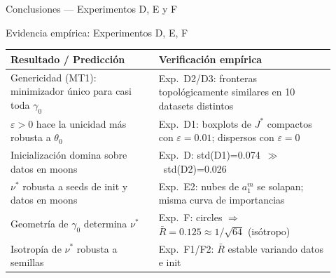 \documentclass[10pt]{beamer}
\begin{document}
\begin{frame}{Conclusiones — Experimentos D, E y F}

\begin{block}{Evidencia empírica: Experimentos D, E, F}
\small
\begin{tabular}{p{0.42\linewidth}p{0.50\linewidth}}
  \toprule
  Resultado / Predicción & Verificación empírica \\
  \midrule
  Genericidad (MT1): minimizador único para casi toda $\gamma_0$ &
    Exp.\ D2/D3: fronteras topológicamente similares en 10 datasets distintos \\[4pt]
  $\varepsilon>0$ hace la unicidad más robusta a $\theta_0$ &
    Exp.\ D1: boxplots de $J^*$ compactos con $\varepsilon=0.01$; dispersos con $\varepsilon=0$ \\[4pt]
  Inicialización domina sobre datos en moons &
    Exp.\ D: std(D1)=0.074~$\gg$~std(D2)=0.026 \\[4pt]
  $\nu^*$ robusta a seeds de init y datos en moons &
    Exp.\ E2: nubes de $a_1^m$ se solapan; misma curva de importancias \\[4pt]
  Geometría de $\gamma_0$ determina $\nu^*$ &
    Exp.\ F: circles $\Rightarrow$ $\bar{R}=0.125\approx 1/\sqrt{64}$ (isótropo) \\[4pt]
  Isotropía de $\nu^*$ robusta a semillas &
    Exp.\ F1/F2: $\bar{R}$ estable variando datos e init \\
  \bottomrule
\end{tabular}
\end{block}

\end{frame}
\end{document}
